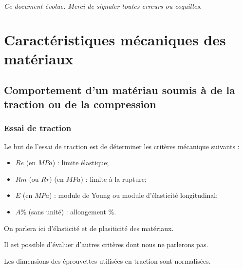 \documentclass[11pt,oneside]{article}
\begin{document}
\textit{Ce document évolue. Merci de signaler toutes erreurs ou coquilles.}


\section{Caractéristiques mécaniques des matériaux}
\subsection{Comportement d'un matériau soumis à de la traction ou de la compression}



\subsubsection{Essai de traction}
\begin{obj}
Le but de l'essai de traction est de déterminer les critères mécanique suivants : 
\begin{itemize}
\item $Re$ (en $MPa$) : limite élastique;
\item $Rm$ (ou $Rr$) (en $MPa$) : limite à la rupture;
\item $E$ (en $MPa$) : module de Young ou module d'élasticité longitudinal;
\item $A\%$ (sans unité) : allongement \%.
\end{itemize}

On parlera ici d'élasticité et de plasiticité des matériaux. 

Il est possible d'évaluer d'autres critères dont nous ne parlerons pas. 
\end{obj}

Les dimensions des éprouvettes utilisées en traction sont normalisées. 
\end{document}
